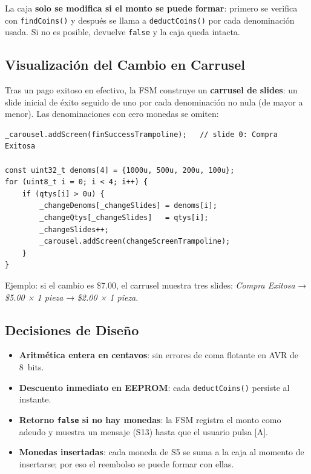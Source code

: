 \documentclass[12pt,a4paper]{article}
\begin{document}
La caja \textbf{solo se modifica si el monto se puede formar}: primero se
verifica con \texttt{findCoins()} y después se llama a \texttt{deductCoins()}
por cada denominación usada. Si no es posible, devuelve \texttt{false} y la
caja queda intacta.

\subsection{Visualización del Cambio en Carrusel}

Tras un pago exitoso en efectivo, la FSM construye un \textbf{carrusel de
slides}: un slide inicial de éxito seguido de uno por cada denominación
no nula (de mayor a menor). Las denominaciones con cero monedas se omiten:

\begin{lstlisting}[style=cpp, caption={Construcción dinámica del carrusel de cambio en onEnterPantallaFin()}]
_carousel.addScreen(finSuccessTrampoline);   // slide 0: Compra Exitosa

const uint32_t denoms[4] = {1000u, 500u, 200u, 100u};
for (uint8_t i = 0; i < 4; i++) {
    if (qtys[i] > 0u) {
        _changeDenoms[_changeSlides] = denoms[i];
        _changeQtys[_changeSlides]   = qtys[i];
        _changeSlides++;
        _carousel.addScreen(changeScreenTrampoline);
    }
}
\end{lstlisting}

Ejemplo: si el cambio es \$7.00, el carrusel muestra tres slides:
\textit{Compra Exitosa} → \textit{\$5.00 × 1 pieza} → \textit{\$2.00 × 1 pieza}.

\subsection{Decisiones de Diseño}

\begin{itemize}
    \item \textbf{Aritmética entera en centavos}: sin errores de coma flotante en AVR de 8~bits.
    \item \textbf{Descuento inmediato en EEPROM}: cada \texttt{deductCoins()} persiste al instante.
    \item \textbf{Retorno \texttt{false} si no hay monedas}: la FSM registra el monto como adeudo y muestra un mensaje (S13) hasta que el usuario pulsa [A].
    \item \textbf{Monedas insertadas}: cada moneda de S5 se suma a la caja al momento de insertarse; por eso el reembolso se puede formar con ellas.
\end{itemize}
\end{document}
